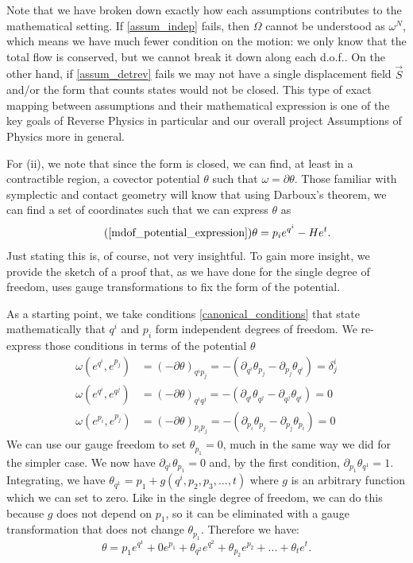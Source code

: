 \documentclass[10pt,twocolumn, nofootinbib]{revtex4-2}
\begin{document}
Note that we have broken down exactly how each assumptions contributes to the mathematical setting. If \ref{assum_indep} fails, then $\Omega$ cannot be understood as $\omega^N$, which means we have much fewer condition on the motion: we only know that the total flow is conserved, but we cannot break it down along each d.o.f.. On the other hand, if \ref{assum_detrev} fails we may not have a single displacement field $\vec{S}$ and/or the form that counts states would not be closed. This type of exact mapping between assumptions and their mathematical expression is one of the key goals of Reverse Physics in particular and our overall project Assumptions of Physics more in general.

For (ii), we note that since the form is closed, we can find, at least in a contractible region, a covector potential $\theta$ such that $\omega=\partial \theta$. Those familiar with symplectic and contact geometry will know that using Darboux's theorem, we can find a set of coordinates such that we can express $\theta$ as
\begin{equation}
	\tag*{(\ref{mdof_potential_expression})}
	\theta = p_i e^{q^i} - H e^t.
\end{equation}
Just stating this is, of course, not very insightful. To gain more insight, we provide the sketch of a proof that, as we have done for the single degree of freedom, uses gauge transformations to fix the form of the potential. 

As a starting point, we take conditions \ref{canonical_conditions} that state mathematically that $q^i$ and $p_i$ form independent degrees of freedom. We re-express those conditions in terms of the potential $\theta$
\begin{equation}\label{canonical_potential_conditions}
\begin{aligned}
	\omega(e^{q^i}, e^{p_j}) &= (-\partial\theta)_{q^i p_j} = -(\partial_{q^i}\theta_{p_j} - \partial_{p_j}\theta_{q^i}) = \delta^i_j \\
	\omega(e^{q^i}, e^{q^j}) &= (-\partial\theta)_{q^i q^j} = -(\partial_{q^i}\theta_{q^j} - \partial_{q^j}\theta_{q^i}) = 0 \\
	\omega(e^{p_i}, e^{p_j}) &= (-\partial\theta)_{p_i p_j} = -(\partial_{p_i}\theta_{p_j} - \partial_{p_j}\theta_{p_i}) = 0
\end{aligned}
\end{equation}
We can use our gauge freedom to set $\theta_{p_1} = 0$, much in the same way we did for the simpler case. We now have $\partial_{q^1} \theta_{p_1} = 0$ and, by the first condition, $\partial_{p_1} \theta_{q^1} = 1$. Integrating, we have $\theta_{q^1} = p_1 + g(q^i, p_2, p_3, ..., t)$ where $g$ is an arbitrary function which we can set to zero. Like in the single degree of freedom, we can do this because $g$ does not depend on $p_1$, so it can be eliminated with a gauge transformation that does not change $\theta_{p_1}$. Therefore we have:
\begin{equation}
	\theta = p_1 e^{q^1} + 0 e^{p_1} + \theta_{q^2} e^{q^2} + \theta_{p_2} e^{p_2} + ... + \theta_{t} e^{t}.
\end{equation}
\end{document}
